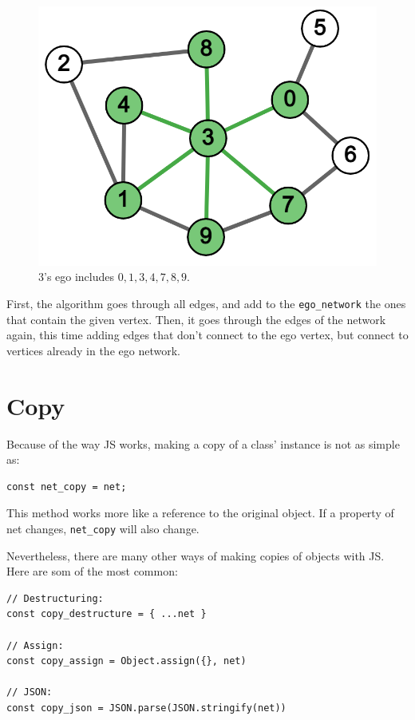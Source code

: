 \begin{figure}[H]
  \includegraphics[width=\linewidth]{img/ego_3.png}
  \caption{3's ego includes $0,1,3,4,7,8,9$.}
  \label{fig:core_ex}
\end{figure}

First, the algorithm goes through all edges, and add to the \texttt{ego_network}
the ones that contain the given vertex.
Then, it goes through the edges of the network again,
this time adding edges that don't connect to the ego vertex,
but connect to vertices already in the ego network.

\section{Copy}

Because of the way JS works, making a copy of a class' instance is not as simple as:
\begin{verbatim}
const net_copy = net;
\end{verbatim}

This method works more like a reference to the original object.
If a property of net changes, \texttt{net_copy} will also change.

Nevertheless, there are many other ways of making copies of objects with JS.
Here are som of the most common:
\begin{verbatim}
// Destructuring:
const copy_destructure = { ...net }

// Assign:
const copy_assign = Object.assign({}, net)

// JSON:
const copy_json = JSON.parse(JSON.stringify(net))
\end{verbatim}


